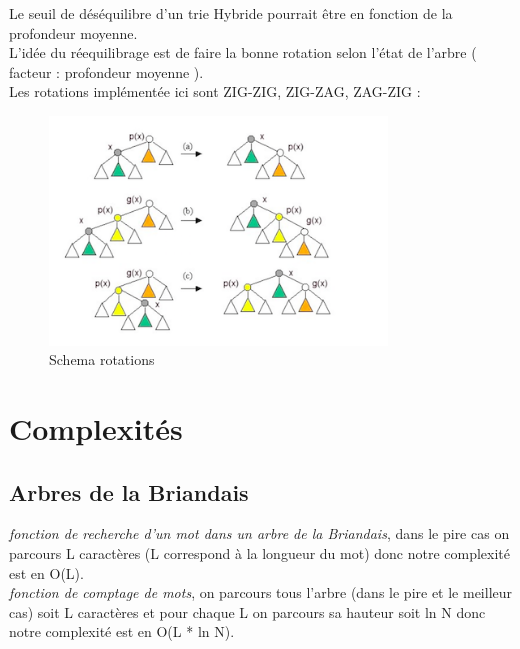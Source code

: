 \documentclass[a4paper,8pt]{report}
\begin{document}
Le seuil de déséquilibre d'un trie Hybride pourrait être en fonction de la profondeur moyenne.\\
L'idée du réequilibrage est de faire la bonne rotation selon l'état de l'arbre ( facteur : profondeur moyenne ).\\
Les rotations implémentée ici sont ZIG-ZIG, ZIG-ZAG, ZAG-ZIG :
\begin{figure}[H]
  \centering
  \includegraphics[width=0.8\textwidth]{rotations.png}
  \caption{Schema rotations}
  \label{fig:Schama rotations}
\end{figure}

\chapter{Complexités}

\section*{Arbres de la Briandais}\label{sec:name}

\textit{fonction de recherche d'un mot dans un arbre de la Briandais}, dans le pire cas on parcours L caract\`eres (L correspond \`a la longueur du mot) donc notre complexit\'e est en O(L).\\

\smallskip
\textit{fonction de comptage de mots}, on parcours tous l'arbre (dans le pire et le meilleur cas) soit L caract\`eres et pour chaque L on parcours sa hauteur soit ln N donc notre complexit\'e est en O(L * ln N).\\
\end{document}

